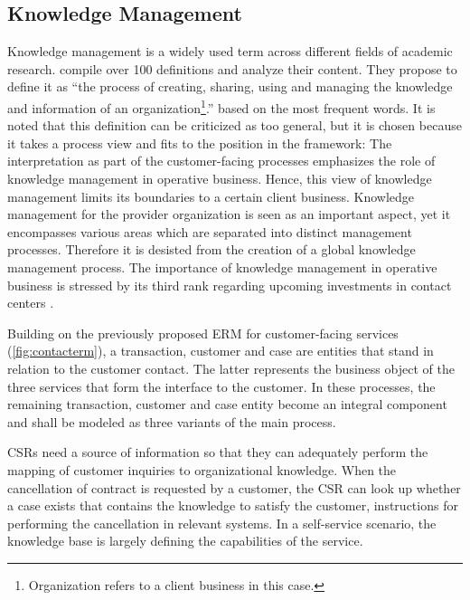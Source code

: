 	 
	 
	 
	 \subsection{Knowledge Management}
	 

Knowledge management is a widely used term across different fields of academic research. \cite{girard2015defining} compile over 100 definitions and analyze their content. They propose to define it as \enquote{the process of creating, sharing, using and managing the knowledge and information of an organization\footnote{Organization refers to a client business in this case.}.} \citep[]{girard2015defining} based on the most frequent words. It is noted that this definition can be criticized as too general, but it is chosen because it takes a process view and fits to the position in the framework: The interpretation as part of the customer-facing processes emphasizes the role of knowledge management in operative business. Hence, this view of knowledge management limits its boundaries to a certain client business. Knowledge management for the provider organization is seen as an important aspect, yet it encompasses various areas which are separated into distinct management processes. Therefore it is desisted from the creation of a global knowledge management process. The importance of knowledge management in operative business is stressed by its third rank regarding upcoming investments in contact centers \citep{ccnet2016}. 

Building on the previously proposed \acrshort{ERM} for customer-facing services (\ref{fig:contacterm}), a transaction, customer and case are entities that stand in relation to the customer contact. The latter represents the business object of the three services that form the interface to the customer. In these processes, the remaining transaction, customer and case entity become an integral component and shall be modeled as three variants of the main process. 

\acrshort{CSR}s need a source of information so that they can adequately perform the mapping of customer inquiries to organizational knowledge. When the cancellation of contract is requested by a customer, the \acrshort{CSR} can look up whether a case exists that contains the knowledge to satisfy the customer, \viz instructions for performing the cancellation in relevant systems. In a self-service scenario, the knowledge base is largely defining the capabilities of the service. 

